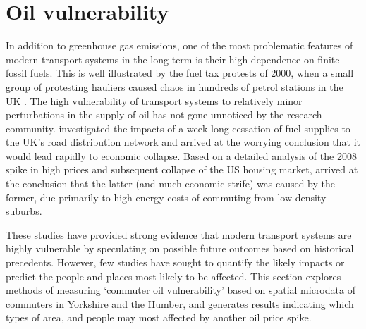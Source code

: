 \section{Oil vulnerability} \label{svul}
In addition to greenhouse gas emissions, one of the most problematic features
of modern transport systems in the long term is their high dependence on finite
fossil fuels. This is well illustrated by the fuel tax protests of 2000, when
a small group of protesting hauliers caused chaos in hundreds of petrol
stations in the UK \citep{Lyons2002}.
The high vulnerability of transport systems to relatively minor perturbations
in the supply of oil has not gone unnoticed by the research community.
\citet{McKinnon2006} investigated the impacts of a week-long cessation of
fuel supplies to the UK's road distribution network and arrived at the worrying
conclusion that it would lead rapidly to economic collapse. %
Based on a detailed analysis of the 2008 spike in high prices and subsequent
collapse of the US housing market, \citet{Sexton2011} arrived at the conclusion
that the latter (and much economic strife) was caused by the former, due
primarily to high energy costs of commuting from low density suburbs.

These studies have provided strong evidence that modern transport systems
are highly vulnerable by speculating on possible future outcomes based on
historical precedents. However, few studies have sought to {quantify} the
likely impacts or predict the people and places most likely to be affected.
This section explores methods of measuring `commuter oil vulnerability' based
on spatial microdata of commuters in Yorkshire and the Humber, and generates
results indicating which types of area, and people may most affected by another
oil price spike.


